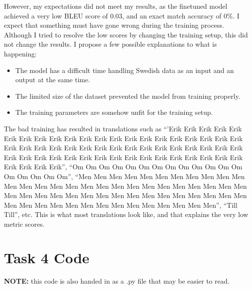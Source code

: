 \documentclass{article}
\begin{document}
However, my expectations did not meet my results, as the finetuned model achieved a very low BLEU score of 0.03, and an exact match accuracy of 0\%. I expect that something must have gone wrong during the training process. Although I tried to resolve the low scores by changing the training setup, this did not change the results. I propose a few possible explanations to what is happening: 
\begin{itemize}
    \item The model has a difficult time handling Swedish data as an input and an output at the same time.
    \item The limited size of the dataset prevented the model from training properly.
    \item The training parameters are somehow unfit for the training setup.
\end{itemize}

The bad training has resulted in translations such as ``'Erik Erik Erik Erik Erik Erik Erik Erik Erik Erik Erik Erik Erik Erik Erik Erik Erik Erik Erik Erik Erik Erik Erik Erik Erik Erik Erik Erik Erik Erik Erik Erik Erik Erik Erik Erik Erik Erik Erik Erik Erik Erik Erik Erik Erik Erik Erik Erik Erik Erik Erik Erik Erik Erik Erik Erik Erik'', ``Om Om Om Om Om Om Om Om Om Om Om Om Om Om Om Om Om Om'', ``Men Men Men Men Men Men Men Men Men Men Men Men Men Men Men Men Men Men Men Men Men Men Men Men Men Men Men Men Men Men Men Men Men Men Men Men Men Men Men Men Men Men Men Men Men Men Men Men Men Men Men Men Men Men Men Men Men'', ``Till Till'', etc. This is what most translations look like, and that explains the very low metric scores.



\newpage
\appendix
\section{Task 4 Code}
\textbf{NOTE:} this code is also handed in as a .py file that may be easier to read.
\end{document}

